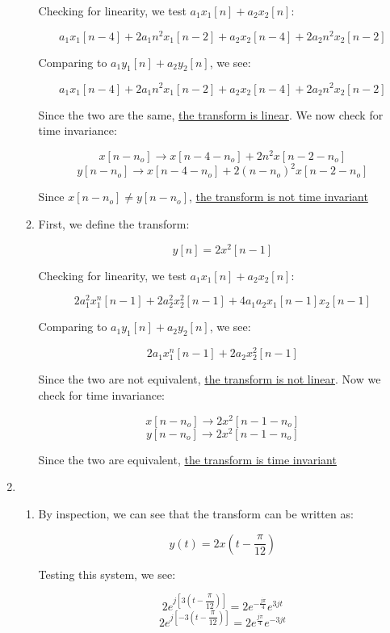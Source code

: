\begin{enumerate}
\begin{enumerate}[label=\textbf{\alph*)}]
        Checking for linearity, we test $a_1x_1[n]+a_2x_2[n]$:

        $$a_1x_1[n-4]+2a_1n^2x_1[n-2]+a_2x_2[n-4]+2a_2n^2x_2[n-2]$$

        Comparing to $a_1y_1[n]+a_2y_2[n]$, we see:

        $$a_1x_1[n-4]+2a_1n^2x_1[n-2]+a_2x_2[n-4]+2a_2n^2x_2[n-2]$$

        Since the two are the same, \underline{the transform is linear}. We now check for time invariance:

        $$x[n-n_o]\to x[n-4-n_o]+2n^2x[n-2-n_o]$$
        $$y[n-n_o]\to x[n-4-n_o]+2(n-n_o)^2x[n-2-n_o]$$

        Since $x[n-n_o]\neq y[n-n_o]$, \underline{the transform is not time invariant}

      \item 

        First, we define the transform:

        $$y[n]=2x^2[n-1]$$

        Checking for linearity, we test $a_1x_1[n]+a_2x_2[n]$:

        $$2a_1^2x_1^n[n-1]+2a_2^2x_2^2[n-1]+4a_1a_2x_1[n-1]x_2[n-1]$$

        Comparing to $a_1y_1[n]+a_2y_2[n]$, we see:

        $$2a_1x_1^n[n-1]+2a_2x_2^2[n-1]$$

        Since the two are not equivalent, \underline{the transform is not linear}. Now we check for time invariance:

        $$x[n-n_o]\to 2x^2[n-1-n_o]$$
        $$y[n-n_o]\to 2x^2[n-1-n_o]$$

        Since the two are equivalent, \underline{the transform is time invariant}

    \end{enumerate}

  \item

    \begin{enumerate}[label=\textbf{\alph*.}]

      \item 

        By inspection, we can see that the transform can be written as:

        $$y(t)=2x\left( t-\frac{\pi}{12} \right)$$

        Testing this system, we see:

        $$2e^{j\left[ 3\left( t-\dfrac{\pi}{12} \right) \right]}=2e^{-\frac{j\pi}{4}}e^{3jt}$$
        $$2e^{j\left[ -3\left( t-\dfrac{\pi}{12} \right) \right]}=2e^{\frac{j\pi}{4}}e^{-3jt}$$


\end{enumerate}
\end{enumerate}
